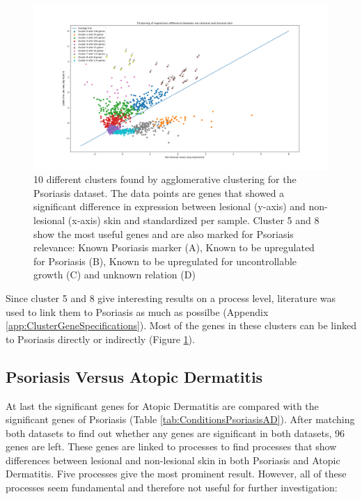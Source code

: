 \documentclass[10pt,a4paper]{article}
\begin{document}
	\begin{figure}[H]
		\includegraphics[width=\textwidth]{10_Clusters_Psoriasis_Results.png}
	
		\caption{10 different clusters found by agglomerative clustering for the Psoriasis dataset. The data points are genes that showed a significant difference in expression between lesional (y-axis) and non-lesional (x-axis) skin and standardized per sample. Cluster 5 and 8 show the most useful genes and are also marked for Psoriasis relevance: Known Psoriasis marker (A), Known to be upregulated for Psoriasis (B), Known to be upregulated for uncontrollable growth (C) and unknown relation (D)}
		\label{fig:ClusteredGenes}
	\end{figure}
	
	Since cluster 5 and 8 give interesting results on a process level, literature was used to link them to Psoriasis as much as possilbe (Appendix \ref{app:ClusterGeneSpecifications}). Most of the genes in these clusters can be linked to Psoriasis directly or indirectly (Figure \ref{fig:ClusteredGenes}).
	
	\subsection{Psoriasis Versus Atopic Dermatitis}
	\label{subsec:ResultsPsoriasisVersusAtopicDermatitis}
	
	At last the significant genes for Atopic Dermatitis are compared with the significant genes of Psoriasis (Table \ref{tab:ConditionsPsoriasisAD}). After matching both datasets to find out whether any genes are significant in both datasets, 96 genes are left. These genes are linked to processes to find processes that show differences between lesional and non-lesional skin in both Psoriasis and Atopic Dermatitis. Five processes give the most prominent result. However, all of these processes seem fundamental and therefore not useful for further investigation:
	
\end{document}
